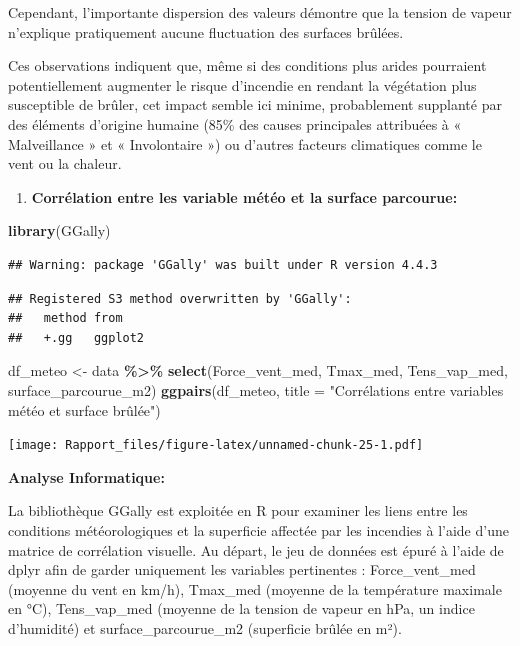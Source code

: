 \documentclass[
]{article}
\newenvironment{Shaded}{\begin{snugshade}}{\end{snugshade}}
\newcommand{\AttributeTok}[1]{\textcolor[rgb]{0.13,0.29,0.53}{#1}}
\newcommand{\FunctionTok}[1]{\textcolor[rgb]{0.13,0.29,0.53}{\textbf{#1}}}
\newcommand{\NormalTok}[1]{#1}
\newcommand{\OtherTok}[1]{\textcolor[rgb]{0.56,0.35,0.01}{#1}}
\newcommand{\SpecialCharTok}[1]{\textcolor[rgb]{0.81,0.36,0.00}{\textbf{#1}}}
\newcommand{\StringTok}[1]{\textcolor[rgb]{0.31,0.60,0.02}{#1}}
\providecommand{\tightlist}{%
  \setlength{\itemsep}{0pt}\setlength{\parskip}{0pt}}
\begin{document}
Cependant, l'importante dispersion des valeurs démontre que la tension
de vapeur n'explique pratiquement aucune fluctuation des surfaces
brûlées.

Ces observations indiquent que, même si des conditions plus arides
pourraient potentiellement augmenter le risque d'incendie en rendant la
végétation plus susceptible de brûler, cet impact semble ici minime,
probablement supplanté par des éléments d'origine humaine (85\% des
causes principales attribuées à « Malveillance » et « Involontaire ») ou
d'autres facteurs climatiques comme le vent ou la chaleur.

\begin{enumerate}
\def\labelenumi{\arabic{enumi}.}
\setcounter{enumi}{2}
\tightlist
\item
  \textbf{Corrélation entre les variable météo et la surface parcourue:}
\end{enumerate}

\begin{Shaded}
\begin{Highlighting}[]
\FunctionTok{library}\NormalTok{(GGally)}
\end{Highlighting}
\end{Shaded}

\begin{verbatim}
## Warning: package 'GGally' was built under R version 4.4.3
\end{verbatim}

\begin{verbatim}
## Registered S3 method overwritten by 'GGally':
##   method from   
##   +.gg   ggplot2
\end{verbatim}

\begin{Shaded}
\begin{Highlighting}[]
\NormalTok{df\_meteo }\OtherTok{\textless{}{-}}\NormalTok{ data }\SpecialCharTok{\%\textgreater{}\%}
  \FunctionTok{select}\NormalTok{(Force\_vent\_med, Tmax\_med, Tens\_vap\_med, surface\_parcourue\_m2)}
\FunctionTok{ggpairs}\NormalTok{(df\_meteo,}
        \AttributeTok{title =} \StringTok{"Corrélations entre variables météo et surface brûlée"}\NormalTok{)}
\end{Highlighting}
\end{Shaded}

\texttt{[image: Rapport\_files/figure-latex/unnamed-chunk-25-1.pdf]}

\textbf{Analyse Informatique:}

La bibliothèque GGally est exploitée en R pour examiner les liens entre
les conditions météorologiques et la superficie affectée par les
incendies à l'aide d'une matrice de corrélation visuelle. Au départ, le
jeu de données est épuré à l'aide de dplyr afin de garder uniquement les
variables pertinentes : Force\_vent\_med (moyenne du vent en km/h),
Tmax\_med (moyenne de la température maximale en °C), Tens\_vap\_med
(moyenne de la tension de vapeur en hPa, un indice d'humidité) et
surface\_parcourue\_m2 (superficie brûlée en m²).
\end{document}
